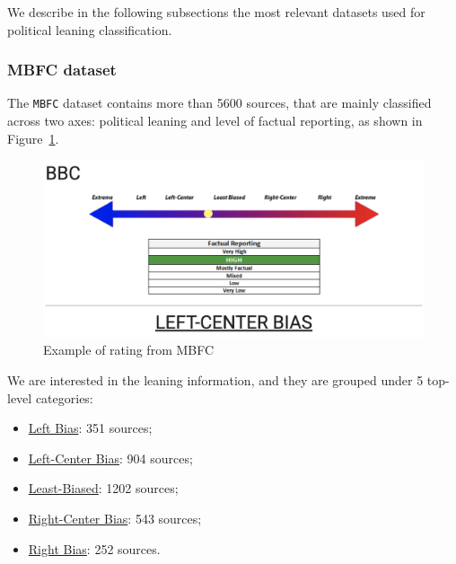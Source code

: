 


We describe in the following subsections the most relevant datasets used for political leaning classification.



\subsubsection{MBFC dataset}

The \texttt{MBFC} dataset contains more than 5600 sources, that are mainly classified across two axes: political leaning and level of factual reporting, as shown in Figure~\ref{fig:mbfc_bbc}.

\begin{figure}[!htbp]
    \centering
    \includegraphics[width=\linewidth]{figures/mbfc_bbc.png}
    \caption{Example of rating from MBFC}
    \label{fig:mbfc_bbc}
\end{figure}

We are interested in the leaning information, and they are grouped under 5 top-level categories:

\begin{itemize}
    \item \href{https://mediabiasfactcheck.com/left/}{Left Bias}: 351 sources;
    \item \href{https://mediabiasfactcheck.com/leftcenter/}{Left-Center Bias}: 904 sources;
    \item \href{https://mediabiasfactcheck.com/center/}{Least-Biased}: 1202 sources;
    \item \href{https://mediabiasfactcheck.com/right-center/}{Right-Center Bias}: 543 sources;
    \item \href{https://mediabiasfactcheck.com/right/}{Right Bias}: 252 sources.
\end{itemize}


